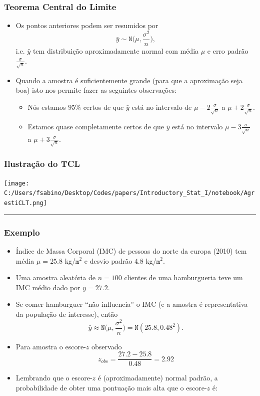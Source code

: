 \documentclass[]{article}
\providecommand{\tightlist}{%
  \setlength{\itemsep}{0pt}\setlength{\parskip}{0pt}}
\begin{document}
\subsubsection{Teorema Central do
Limite}\label{teorema-central-do-limite}

\begin{itemize}
\tightlist
\item
  Os pontos anteriores podem ser resumidos por \[
    \bar{y}\sim \texttt{N}\bigg(\mu,\frac{\sigma^{2}}{{n}}\bigg),
    \] i.e. \(\bar{y}\) tem distribuição aproximadamente normal com
  média \(\mu\) e erro padrão \(\frac{\sigma}{\sqrt{n}}\).
\item
  Quando a amostra é suficientemente grande (para que a aproximação seja
  boa) isto nos permite fazer as seguintes observações:

  \begin{itemize}
  \tightlist
  \item
    Nós estamos \(95\%\) certos de que \(\bar{y}\) está no intervalo de
    \(\mu-2\frac{\sigma}{\sqrt{n}}\) a \(\mu+2\frac{\sigma}{\sqrt{n}}\).
  \item
    Estamos quase completamente certos de que \(\bar{y}\) está no
    intervalo \(\mu-3\frac{\sigma}{\sqrt{n}}\) a
    \(\mu+3\frac{\sigma}{\sqrt{n}}\).
  \end{itemize}
\end{itemize}

\subsubsection{Ilustração do TCL}\label{ilustracao-do-tcl}

\texttt{[image: C:/Users/fsabino/Desktop/Codes/papers/Introductory\_Stat\_I/notebook/AgrestiCLT.png]}

\begin{center}\rule{0.5\linewidth}{\linethickness}\end{center}

\subsubsection{Exemplo}\label{exemplo-1}

\begin{itemize}
\tightlist
\item
  Índice de Massa Corporal (IMC) de pessoas do norte da europa (2010)
  tem média \(\mu=25.8\) kg/\(\mathtt{m}^2\) e desvio padrão \(4.8\)
  kg/\(\mathtt{m}^2\).
\item
  Uma amostra aleatória de \(n=100\) clientes de uma hamburgueria teve
  um IMC médio dado por \(\bar{y}=27.2\).
\item
  Se comer hamburguer ``não influencia'' o IMC (e a amostra é
  representativa da população de interesse), então
  \[\bar{y} \approx \texttt{N}\bigg(\mu,\frac{\sigma^2}{n}\bigg)=\texttt{N}(25.8,0.48^2).\]
\item
  Para amostra o escore-\(z\) observado
  \[z_{obs}=\frac{27.2-25.8}{0.48}=2.92\]
\item
  Lembrando que o escore-\(z\) é (aproximadamente) normal padrão, a
  probabilidade de obter uma pontuação mais alta que o escore-\(z\) é:
\end{itemize}
\end{document}
